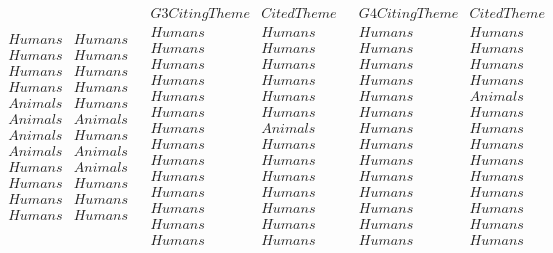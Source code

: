 \begin{table}[h]
\begin{center}
{\[\begin{array}{c|cccc}
\begin{array}{cc}
{Humans} & {Humans} \\
{Humans} & {Humans} \\
{Humans} & {Humans} \\
{Humans} & {Humans} \\
{Animals} & {Humans} \\
{Animals} & {Animals} \\
{Animals} & {Humans} \\
{Animals} & {Animals} \\
{Humans} & {Animals} \\
{Humans} & {Humans} \\
{Humans} & {Humans} \\
{Humans} & {Humans} \\
\end{array}
&
\begin{array}{cc}
{G3 Citing Theme} & {Cited Theme} \\
\hline
{Humans} & {Humans} \\
{Humans} & {Humans} \\
{Humans} & {Humans} \\
{Humans} & {Humans} \\
{Humans} & {Humans} \\
{Humans} & {Humans} \\
{Humans} & {Animals} \\
{Humans} & {Humans} \\
{Humans} & {Humans} \\
{Humans} & {Humans} \\
{Humans} & {Humans} \\
{Humans} & {Humans} \\
{Humans} & {Humans} \\
{Humans} & {Humans} \\
\end{array}
&
\begin{array}{cc}
{G4 Citing Theme} & {Cited Theme} \\
\hline
{Humans} & {Humans} \\
{Humans} & {Humans} \\
{Humans} & {Humans} \\
{Humans} & {Humans} \\
{Humans} & {Animals} \\
{Humans} & {Humans} \\
{Humans} & {Humans} \\
{Humans} & {Humans} \\
{Humans} & {Humans} \\
{Humans} & {Humans} \\
{Humans} & {Humans} \\
{Humans} & {Humans} \\
{Humans} & {Humans} \\
{Humans} & {Humans} \\
\end{array}
\\
\end{array}
\]
}
\end{center}
\end{table}

